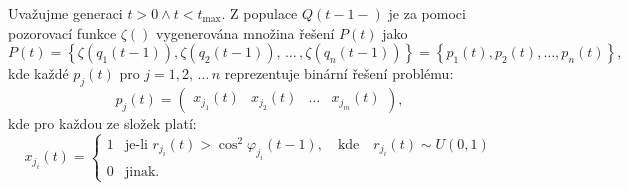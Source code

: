 Uvažujme generaci $t>0 \wedge t<t_{\text{max}}$. Z populace $Q\left(t-1-\right)$ je za pomoci pozorovací funkce $\zeta\left(\right)$ vygenerována množina řešení $P\left(t\right)$ jako
\begin{equation}
    P\left(t\right) = \left\{\zeta\left(q_1\left(t-1\right)\right), \zeta\left(q_2\left(t-1\right)\right), \,\dots\, , \zeta\left(q_n\left(t-1\right)\right) \right\} = \left\{ p_1\left(t\right), p_2\left(t\right), \dots, p_n\left(t\right) \right\},
\end{equation}
kde každé $p_j\left(t\right)$ pro $j=1,2,\,\dots\,n$ reprezentuje binární řešení problému:
\begin{equation*}
    p_j\left(t\right) = 
    \begin{pmatrix}
        x_{j_1}\left(t\right) & x_{j_2}\left(t\right) & \dots & x_{j_m}\left(t\right)
    \end{pmatrix},
\end{equation*}
kde pro každou ze složek platí:
\begin{equation*}
    x_{j_i}\left(t\right) =
    \begin{cases}
      1 & \text{je-li } r_{j_i}\left(t\right) >\cos^2 \varphi_{j_i}\left(t-1\right),\quad\text{kde}\quad r_{j_i}\left(t\right) \sim U\left(0,1\right)\\
      0 & \text{jinak.}
    \end{cases}
\end{equation*}

